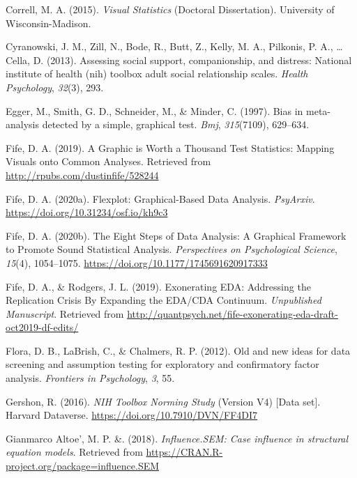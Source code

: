 \documentclass[
  english,
  doc]{apa6}
\newlength{\cslhangindent}
\newenvironment{cslreferences}%
  {\setlength{\parindent}{0pt}%
  \everypar{\setlength{\hangindent}{\cslhangindent}}\ignorespaces}%
  {\par}
\begin{document}
\begin{cslreferences}
\leavevmode\hypertarget{ref-Correll2015}{}%
Correll, M. A. (2015). \emph{Visual Statistics} (Doctoral Dissertation). University of Wisconsin-Madison.

\leavevmode\hypertarget{ref-cyranowski2013assessing}{}%
Cyranowski, J. M., Zill, N., Bode, R., Butt, Z., Kelly, M. A., Pilkonis, P. A., \ldots{} Cella, D. (2013). Assessing social support, companionship, and distress: National institute of health (nih) toolbox adult social relationship scales. \emph{Health Psychology}, \emph{32}(3), 293.

\leavevmode\hypertarget{ref-egger1997bias}{}%
Egger, M., Smith, G. D., Schneider, M., \& Minder, C. (1997). Bias in meta-analysis detected by a simple, graphical test. \emph{Bmj}, \emph{315}(7109), 629--634.

\leavevmode\hypertarget{ref-Fife2019b}{}%
Fife, D. A. (2019). A Graphic is Worth a Thousand Test Statistics: Mapping Visuals onto Common Analyses. Retrieved from \url{http://rpubs.com/dustinfife/528244}

\leavevmode\hypertarget{ref-Fife2019c}{}%
Fife, D. A. (2020a). Flexplot: Graphical-Based Data Analysis. \emph{PsyArxiv}. \url{https://doi.org/10.31234/osf.io/kh9c3}

\leavevmode\hypertarget{ref-Fife2019e}{}%
Fife, D. A. (2020b). The Eight Steps of Data Analysis: A Graphical Framework to Promote Sound Statistical Analysis. \emph{Perspectives on Psychological Science}, \emph{15}(4), 1054--1075. \url{https://doi.org/10.1177/1745691620917333}

\leavevmode\hypertarget{ref-Fife2019a}{}%
Fife, D. A., \& Rodgers, J. L. (2019). Exonerating EDA: Addressing the Replication Crisis By Expanding the EDA/CDA Continuum. \emph{Unpublished Manuscript}. Retrieved from \url{http://quantpsych.net/fife-exonerating-eda-draft-oct2019-df-edits/}

\leavevmode\hypertarget{ref-flora2012old}{}%
Flora, D. B., LaBrish, C., \& Chalmers, R. P. (2012). Old and new ideas for data screening and assumption testing for exploratory and confirmatory factor analysis. \emph{Frontiers in Psychology}, \emph{3}, 55.

\leavevmode\hypertarget{ref-toolboxData}{}%
Gershon, R. (2016). \emph{NIH Toolbox Norming Study} (Version V4) {[}Data set{]}. Harvard Dataverse. \url{https://doi.org/10.7910/DVN/FF4DI7}

\leavevmode\hypertarget{ref-influenceSEM}{}%
Gianmarco Altoe', M. P. \&. (2018). \emph{Influence.SEM: Case influence in structural equation models}. Retrieved from \url{https://CRAN.R-project.org/package=influence.SEM}


\end{cslreferences}
\end{document}
